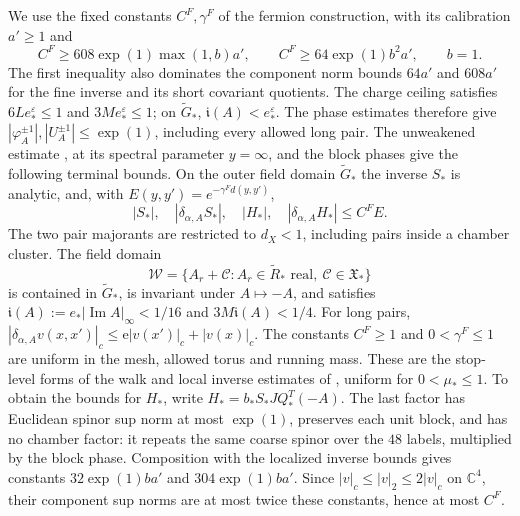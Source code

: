 \documentclass[11pt,letterpaper,reqno]{amsart}
\newcommand{\C}{\mathbb C}
\begin{document}
We use the fixed constants $C^F,\gamma^F$
of the fermion construction, with its calibration
$a'\ge1$ and
\[
 C^F\ge608\exp(1)\max(1,b)a',
 \qquad C^F\ge64\exp(1)b^2a',\qquad b=1.
\]
The first inequality also dominates the component
norm bounds $64a'$ and $608a'$ for the fine
inverse and its short covariant quotients.
The charge ceiling satisfies
$6Le_*^\varepsilon\le1$ and
$3Me_*^\varepsilon\le1$; on $\widetilde G_*$,
$\mathfrak i(A)<e_*^\varepsilon$. The phase
estimates therefore give
$|\varphi_A^{\pm1}|,|U_A^{\pm1}|\le\exp(1)$,
including every allowed long pair.
The unweakened estimate
\cite[(43)]{FermionBlock}, at its
spectral parameter $y=\infty$, and the block
phases give the following terminal bounds.
On the outer field domain $\widetilde G_*$ the inverse
$S_*$ is analytic, and, with
$E(y,y')=e^{-\gamma^Fd(y,y')}$,
\begin{equation}\label{eq:interacting-terminal-input}
 |S_*|,\quad|\delta_{\alpha,A}S_*|,\quad
 |H_*|,\quad|\delta_{\alpha,A}H_*|
                                  \le C^FE.
\end{equation}
The two pair majorants are restricted to $d_X<1$,
including pairs inside a chamber cluster.
The field domain
\[
 \mathcal W=\{A_r+\mathscr C:
          A_r\in\widetilde R_*\text{ real},\
          \mathscr C\in\mathfrak X_*\}
\]
is contained in $\widetilde G_*$, is invariant under
$A\mapsto-A$, and satisfies
$\mathfrak i(A):=e_*|\operatorname{Im}A|_\infty<1/16$
and $3M\mathfrak i(A)<1/4$. For long pairs,
$|\delta_{\alpha,A}v(x,x')|_c
\le\mathrm e|v(x')|_c+|v(x)|_c$.
The constants $C^F\ge1$ and $0<\gamma^F\le1$ are
uniform in the mesh, allowed torus and running mass. These
are the stop-level forms of the walk and local inverse estimates
of \cite[\S3]{FermionBlock}, uniform for $0<\mu_*\le1$. To obtain the bounds
for $H_*$, write
$H_*=b_*S_*JQ_*^T(-A)$. The last factor has
Euclidean spinor sup norm at most $\exp(1)$,
preserves each unit block, and has no chamber
factor: it repeats the same coarse spinor over
the $48$ labels, multiplied by the block phase.
Composition with the localized inverse bounds
gives constants $32\exp(1)ba'$ and
$304\exp(1)ba'$. Since
$|v|_c\le|v|_2\le2|v|_c$ on $\C^4$,
their component sup norms are at most twice
these constants, hence at most $C^F$.
\end{document}
